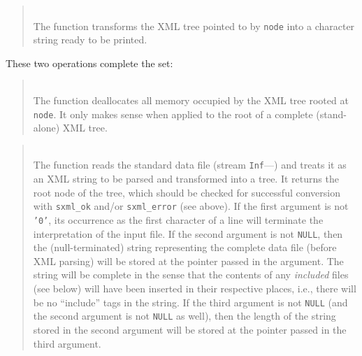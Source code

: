\begin{quote}
\noindent\hspace{-0.35in}{\tt char *sxml\_toxml (sxml\_t node); }\\ \hspace{0in}
The function transforms the XML tree pointed to by {\tt node} into a
character string ready to be printed.
\end{quote}

These two operations complete the set:

\begin{quote}
\noindent\hspace{-0.35in}{\tt void sxml\_free (sxml\_t node); }\\ \hspace{0in}
The function deallocates all memory occupied by the XML tree rooted at
{\tt node}.
It only makes sense when applied to the root of a complete (stand-alone)
XML tree.
\end{quote}

\begin{quote}
\noindent{}\\ \hspace{0in}
The function reads the standard data file (stream {\tt Inf}---)
and treats it as an XML string to be parsed and transformed into a tree.
It returns the root node of the tree, which should be checked for 
successful conversion with {\tt sxml\_ok} and/or {\tt sxml\_error} (see above).
If the first argument is not {\tt '{}0'}, its occurrence as the first
character of a line will terminate the interpretation of the input file.
If the second argument is not {\tt NULL}, then the (null-terminated)
string representing the complete
data file (before XML parsing) will be stored at the pointer passed in the
argument.
The string will be complete in the sense that the contents of any
{\em included\/} files (see below) will have been inserted in their respective
places, i.e., there will be no ``include'' tags in the string.
If the third argument is not {\tt NULL} (and the second argument is not
{\tt NULL} as well), then the length of the string stored in the second
argument will be stored at the pointer passed in the third argument.
\end{quote}

